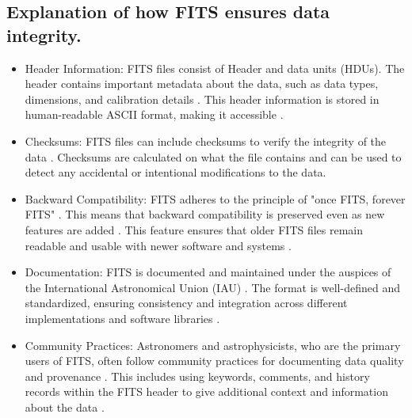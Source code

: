 \documentclass[a4paper,oneside,11pt]{book}
\begin{document}
\subsection{Explanation of how FITS ensures data integrity.}
\begin{itemize}
    \item Header Information: FITS files consist of Header and data units (HDUs). The header contains important metadata about the data, such as data types, dimensions, and calibration details \citep{fits_3}. This header information is stored in human-readable ASCII format, making it accessible \citep{fits_3}.
    \item Checksums: FITS files can include checksums to verify the integrity of the data \citep{seaman1995astronomical}. Checksums are calculated on what the file contains and can be used to detect any accidental or intentional modifications to the data.
    \item Backward Compatibility: FITS adheres to the principle of "once FITS, forever FITS" \citep{fits_3}. This means that backward compatibility is preserved even as new features are added \citep{fits_3}. This feature ensures that older FITS files remain readable and usable with newer software and systems \citep{fits_3}.
    \item Documentation: FITS is documented and maintained under the auspices of the International Astronomical Union (IAU) \citep{fits_3}. The format is well-defined and standardized, ensuring consistency and integration across different implementations and software libraries \citep{fits_3}.
    \item Community Practices: Astronomers and astrophysicists, who are the primary users of FITS, often follow community practices for documenting data quality and provenance \citep{fits_3}. This includes using keywords, comments, and history records within the FITS header to give additional context and information about the data \citep{fits_3}.
\end{itemize}
\end{document}
